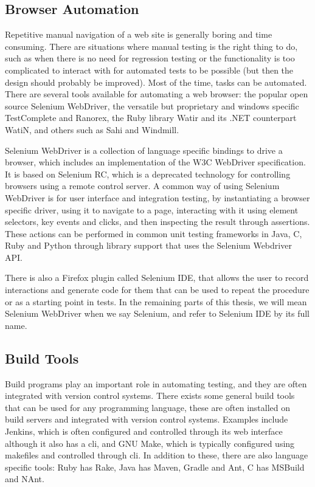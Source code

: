 \documentclass[11pt]{article}
\begin{document}
\subsection{Browser Automation}
\label{subsec:browserautomation}

Repetitive manual navigation of a web site is generally boring and time consuming. There are situations where manual testing is the right thing to do, such as when there is no need for regression testing or the functionality is too complicated to interact with for automated tests to be possible (but then the design should probably be improved). Most of the time, tasks can be automated. There are several tools available for automating a web browser: the popular open source Selenium WebDriver, the versatile but proprietary and windows specific TestComplete and Ranorex, the Ruby library Watir and its .NET counterpart WatiN, and others such as Sahi and Windmill.

Selenium WebDriver is a collection of language specific bindings to drive a browser, which includes an implementation of the W3C WebDriver specification. It is based on Selenium RC, which is a deprecated technology for controlling browsers using a remote control server. A common way of using Selenium WebDriver is for user interface and integration testing, by instantiating a browser specific driver, using it to navigate to a page, interacting with it using element selectors, key events and clicks, and then inspecting the result through assertions. These actions can be performed in common unit testing frameworks in Java, C\nolinebreak\hspace{-.05em}\raisebox{.3ex}{\scriptsize\bf \#}, Ruby and Python through library support that uses the Selenium Webdriver API. \cite{Selenium}\cite{Selenium2}

There is also a Firefox plugin called Selenium IDE, that allows the user to record interactions and generate code for them that can be used to repeat the procedure or as a starting point in tests. In the remaining parts of this thesis, we will mean Selenium WebDriver when we say Selenium, and refer to Selenium IDE by its full name.

\subsection{Build Tools}
\label{subsec:build}

Build programs play an important role in automating testing, and they are often integrated with version control systems. There exists some general build tools that can be used for any programming language, these are often installed on build servers and integrated with version control systems. Examples include Jenkins, which is often configured and controlled through its web interface although it also has a \gls{cli}, and GNU Make, which is typically configured using makefiles and controlled through \gls{cli}. In addition to these, there are also language specific tools: Ruby has Rake, Java has Maven, Gradle and Ant, C\nolinebreak\hspace{-.05em}\raisebox{.3ex}{\scriptsize\bf \#} has MSBuild and NAnt.
\end{document}

